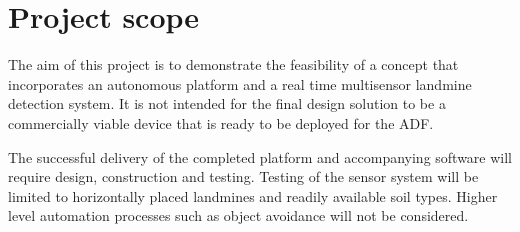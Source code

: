 \documentclass[main.tex]{subfiles}
\begin{document}
\section{Project scope}


The aim of this project is to demonstrate the feasibility of a concept that incorporates an autonomous platform and a real time multisensor landmine detection system. It is not intended for the final design solution to be a commercially viable device that is ready to be deployed for the ADF. 

The successful delivery of the completed platform and accompanying software will require design, construction and testing. Testing of the sensor system will be limited to horizontally placed landmines and readily available soil types. Higher level automation processes such as object avoidance will not be considered. 
\end{document}
